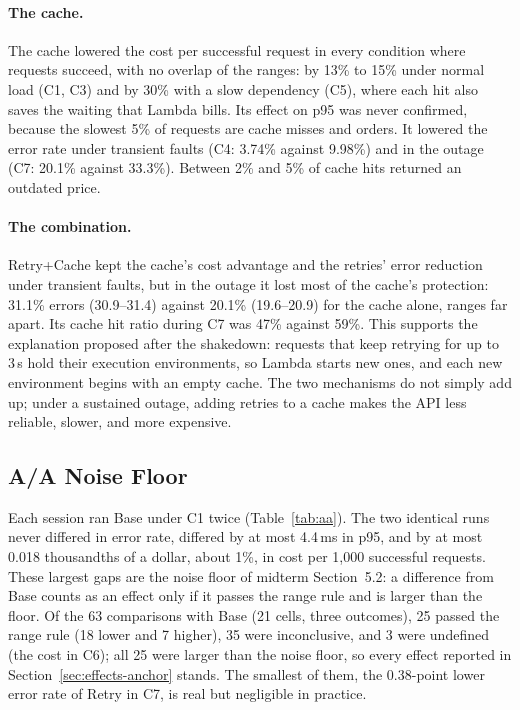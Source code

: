 \documentclass[10pt]{article}
\begin{document}
\paragraph{The cache.} The cache lowered the cost per successful request in
every condition where requests succeed, with no overlap of the ranges: by
13\% to 15\% under normal load (C1, C3) and by 30\% with a slow dependency
(C5), where each hit also saves the waiting that Lambda bills. Its effect on
p95 was never confirmed, because the slowest 5\% of requests are cache misses
and orders. It lowered the error rate under transient faults (C4: 3.74\%
against 9.98\%) and in the outage (C7: 20.1\% against 33.3\%). Between 2\% and
5\% of cache hits returned an outdated price.

\paragraph{The combination.} Retry+Cache kept the cache's cost advantage and
the retries' error reduction under transient faults, but in the outage it lost
most of the cache's protection: 31.1\% errors (30.9--31.4) against 20.1\%
(19.6--20.9) for the cache alone, ranges far apart. Its cache hit ratio during
C7 was 47\% against 59\%. This supports the explanation proposed after the
shakedown: requests that keep retrying for up to 3\,s hold their execution
environments, so Lambda starts new ones, and each new environment begins with an
empty cache. The two mechanisms do not simply add up; under a sustained outage,
adding retries to a cache makes the API less reliable, slower, and more
expensive.

\subsection{A/A Noise Floor}
Each session ran Base under C1 twice (Table~\ref{tab:aa}). The two identical
runs never differed in error rate, differed by at most 4.4\,ms in p95, and by at
most 0.018 thousandths of a dollar, about 1\%, in cost per 1{,}000 successful
requests. These largest gaps are the noise floor of midterm Section~5.2: a
difference from Base counts as an effect only if it passes the range rule and is
larger than the floor. Of the 63 comparisons with Base (21 cells, three
outcomes), 25 passed the range rule (18 lower and 7 higher), 35 were
inconclusive, and 3 were undefined (the cost in C6); all 25 were larger than the
noise floor, so every effect reported in Section~\ref{sec:effects-anchor}
stands. The smallest of them, the 0.38-point lower error rate of Retry in C7, is
real but negligible in practice.
\end{document}
